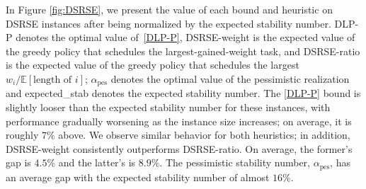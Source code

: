\documentclass[final,5p,times,twocolumn]{elsarticle}
\newcommand{\E}{\mathbb{E}}
\DeclareMathOperator{\pes}{pes}
\begin{document}
In Figure \ref{fig:DSRSE}, we present the value of each bound and heuristic on DSRSE instances after being normalized by the expected stability number.
DLP-P denotes the optimal value of~\eqref{DLP-P}, DSRSE-weight is the expected value of the greedy policy that schedules the largest-gained-weight task, and DSRSE-ratio is the expected value of the greedy policy that schedules the largest $w_i/\E[\text{length of }i]$; $\alpha_\pes$ denotes the optimal value of the pessimistic realization and expected\_stab denotes the expected stability number.
The \eqref{DLP-P} bound is slightly looser than the expected stability number for these instances, with performance gradually worsening as the instance size increases; on average, it is roughly $7\%$ above. 
We observe similar behavior for both heuristics; in addition, DSRSE-weight consistently outperforms DSRSE-ratio. On average, the former's gap is $4.5\%$ and the latter's is $8.9\%$. The pessimistic stability number, $\alpha_\pes$, has an average gap with the expected stability number of almost $16\%$.
\end{document}
